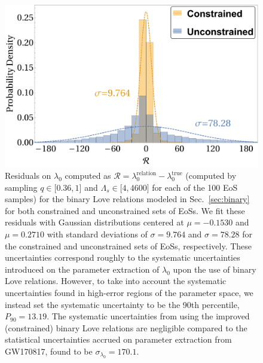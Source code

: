 \documentclass[prd,twocolumn,nofootinbib,superscriptaddress,amsmath,amssymb]{revtex4-1}
\begin{document}
\begin{figure}
\begin{center} 
\includegraphics[width=\columnwidth]{residuals.pdf}
\end{center}
\caption{
Residuals on $\lambda_0$ computed as $\mathcal{R}=\lambda_0^{\text{relation}}-\lambda_0^{\text{true}}$ (computed by sampling $q\in \lbrack0.36,1\rbrack$ and $\Lambda_{s} \in \lbrack 4,4600 \rbrack$ for each of the 100 EoS samples) for the binary Love relations modeled in Sec.~\ref{sec:binary} for both constrained and unconstrained sets of EoSs.
We fit these residuals with Gaussian distributions centered at $\mu=-0.1530$ and $\mu=0.2710$ with standard deviations of $\sigma=9.764$ and $\sigma=78.28$ for the constrained and unconstrained sets of EoSs, respectively.
These uncertainties correspond roughly to the systematic uncertainties introduced on the parameter extraction of $\lambda_0$ upon the use of binary Love relations.
However, to take into account the systematic uncertainties found in high-error regions of the parameter space, we instead set the systematic uncertainty to be the 90th percentile, $P_{90}=13.19$.
The systematic uncertainties from using the improved (constrained) binary Love relations are negligible compared to the statistical uncertainties accrued on parameter extraction from GW170817, found to be $\sigma_{\lambda_0}=170.1$.
}
\label{fig:residuals}
\end{figure}
\end{document}
